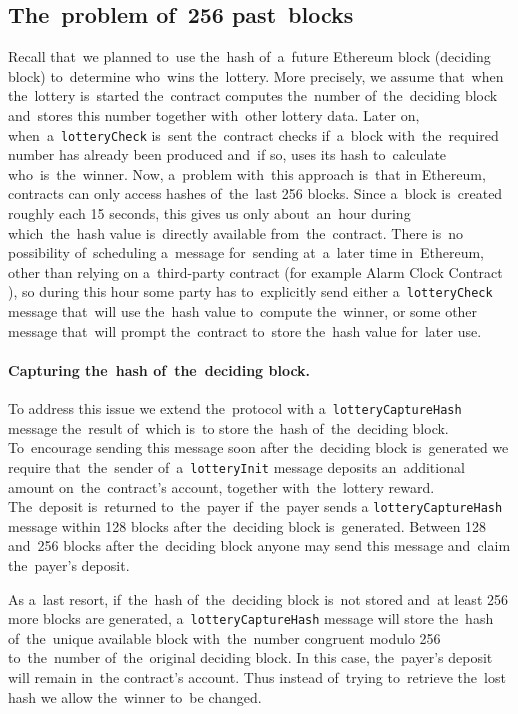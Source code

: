 \documentclass[a4paper]{article}
\begin{document}
\subsection{The~problem of~256 past~blocks}
    \label{sec:problem256}
    Recall that~we planned to~use the~hash of~a~future Ethereum block (deciding block) to~determine who~wins
    the~lottery. More precisely, we assume that~when the~lottery is~started the~contract computes the~number
    of~the~deciding block and~stores this number together with~other lottery data. Later on,
    when~a~\texttt{lotteryCheck} is~sent the~contract checks if~a~block with~the~required number has already been
    produced and~if so, uses its hash to~calculate who~is~the~winner. Now, a~problem with~this approach is~that in
    Ethereum, contracts can only access hashes of~the~last 256 blocks. Since a~block is~created roughly each 15
    seconds, this gives us only about~an~hour during which~the~hash value is~directly available from~the~contract.
    There is~no possibility of~scheduling a~message for~sending at~a~later time in~Ethereum, other than relying on
    a~third-party contract (for example Alarm Clock Contract \cite{ALARM}), so during this hour some party has
    to~explicitly send either a~\texttt{lotteryCheck} message that~will use the~hash value to~compute the~winner,
    or some other message that~will prompt the~contract to~store the~hash value for~later use.

    \paragraph{Capturing the~hash of~the~deciding block.}

    To address this issue we extend the~protocol with a~\texttt{lotteryCaptureHash} message the~result of~which is~to
    store the~hash of~the~deciding block. To~encourage sending this message soon after the~deciding block is~generated
    we require that~the~sender of~a~\texttt{lotteryInit} message deposits an~additional amount on~the~contract's
    account, together with~the~lottery reward. The~deposit is~returned to~the~payer if~the~payer sends a
    \texttt{lotteryCaptureHash} message within 128 blocks after the~deciding block is~generated.
    Between 128 and~256 blocks after the~deciding block anyone may send this message and~claim the~payer's deposit.

    As a~last resort, if~the~hash of~the~deciding block is~not stored and~at least 256 more blocks are generated,
    a~\texttt{lotteryCaptureHash} message will store the~hash of~the~unique available block with~the~number congruent
    modulo 256 to~the~number of~the~original deciding block. In this case, the~payer's deposit will remain in~the
    contract's account. Thus instead of~trying to~retrieve the~lost hash we allow the~winner to~be changed.
\end{document}
